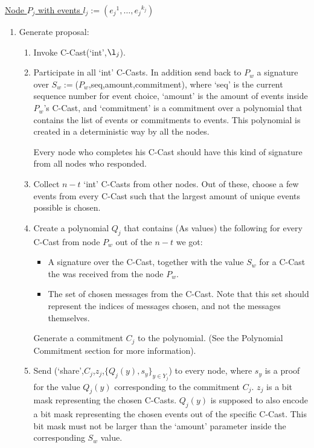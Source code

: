 \uline{Node $P_j$ with events $l_j := ({e_j}^1,\ldots,{e_j}^{k_j})$}
\begin{enumerate}
  \item Generate proposal:
  \begin{enumerate}
    \item Invoke C-Cast(`int',$\l_j$).
    \item Participate in all `int' C-Casts. In addition send back to $P_w$ a
      signature over $S_w := $($P_w$,seq,amount,commitment), where `seq' is the
      current sequence number for event choice, `amount' is the amount of events
      inside $P_w$'s C-Cast, and `commitment' is a commitment over a polynomial
      that contains the list of events or commitments to events. This polynomial
      is created in a deterministic way by all the nodes.
      
      Every node who completes his C-Cast should have this kind of signature
      from all nodes who responded.
    \item Collect $n-t$ `int' C-Casts from other nodes. Out of these, choose a
      few events from every C-Cast such that the largest amount of unique events
      possible is chosen.
    \item Create a polynomial $Q_j$ that contains (As values) the
      following for every C-Cast from node $P_w$ out of the $n-t$ we got:
      \begin{itemize}
        \item A signature over the C-Cast, together with the value $S_w$ for a
          C-Cast the was received from the node $P_w$.
        \item The set of chosen messages from the C-Cast. Note that this set
          should represent the indices of messages chosen, and not the messages
          themselves.
      \end{itemize}
      
      Generate a commitment $C_j$ to the polynomial. (See the Polynomial
      Commitment section for more information).
    \item Send (`share',$C_j$,$z_j$,$\{Q_j(y),s_y\}_{y \in Y_j}$) to every node,
      where $s_y$ is a proof for the value $Q_j(y)$ corresponding to the
      commitment $C_j$. $z_j$ is a bit mask representing the chosen C-Casts.
      $Q_j(y)$ is supposed to also encode a bit mask representing the chosen
      events out of the specific C-Cast. This bit mask must not be larger than
      the `amount' parameter inside the corresponding $S_w$ value.


\end{enumerate}
\end{enumerate}

